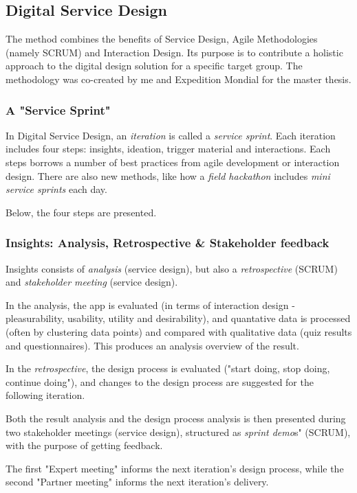 \subsection{Digital Service Design}

The method combines the benefits of Service Design, Agile Methodologies (namely SCRUM) and Interaction Design. Its purpose is to contribute a holistic approach to the digital design solution for a specific target group. The methodology was co-created by me and Expedition Mondial for the master thesis. \cite{nissar-linkedin}

\subsubsection{A "Service Sprint"}
In Digital Service Design, an \textit{iteration} is called a \textit{service sprint}. Each iteration includes four steps: insights, ideation, trigger material and interactions. Each steps borrows a number of best practices from agile development or interaction design. There are also new methods, like how a \textit{field hackathon} includes \textit{mini service sprints} each day.

Below, the four steps are presented.

\subsubsection{Insights: Analysis, Retrospective \& Stakeholder feedback}
  Insights consists of \textit{analysis} (service design), but also a \textit{retrospective} (SCRUM) and \textit{stakeholder meeting} (service design).

    In the analysis, the app is evaluated (in terms of interaction design - pleasurability, usability, utility and desirability), and quantative data is processed (often by clustering data points) and compared with qualitative data (quiz results and questionnaires). This produces an analysis overview of the result.

    In the \textit{retrospective}, the design process is evaluated ("start doing, stop doing, continue doing"), and changes to the design process are suggested for the following iteration.

    Both the result analysis and the design process analysis is then presented during two stakeholder meetings (service design), structured as \textit{sprint demo}s" (SCRUM), with the purpose of getting feedback.

    The first "Expert meeting" informs the next iteration's design process, while the second "Partner meeting" informs the next iteration's delivery.

